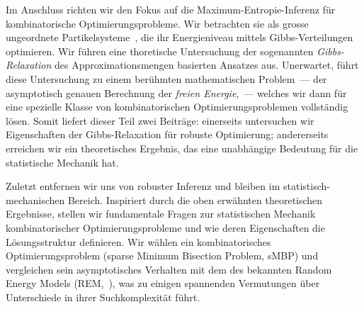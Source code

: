 Im Anschluss richten wir den Fokus auf die Maximum-Entropie-Inferenz für
kombinatorische Optimierungsprobleme. Wir betrachten sie als grosse ungeordnete
Partikelsysteme~\citep{book/MezardM09}, die ihr Energieniveau mittels
Gibbs-Verteilungen optimieren. Wir führen eine thoretische Untersuchung der
sogenannten \textit{Gibbs-Relaxation} des Approximationsmengen basierten
Ansatzes aus. Unerwartet, führt diese Untersuchung zu einem berühmten
mathematischen Problem~--- der asymptotisch genauen Berechnung der
\textit{freien Energie},~--- welches wir dann für eine spezielle Klasse von
kombinatorischen Optimierungsproblemen vollständig lösen. Somit liefert dieser
Teil  zwei Beiträge: einerseits untersuchen wir Eigenschaften der
Gibbs-Relaxation für robuste Optimierung; andererseits erreichen wir ein
theoretisches Ergebnis, das eine unabhängige Bedeutung für die statistische
Mechanik hat.

Zuletzt entfernen wir uns von robuster Inferenz und bleiben im
statistisch-mechanischen Bereich. Inspiriert durch die oben erwähnten
theoretischen Ergebnisse, stellen wir fundamentale Fragen zur statistischen
Mechanik kombinatorischer Optimierungsprobleme und wie deren Eigenschaften die
Lösungsstruktur definieren. Wir wählen ein kombinatorisches Optimierungsproblem
(sparse Minimum Bisection Problem, sMBP) und vergleichen sein asymptotisches
Verhalten mit dem des bekannten Random Energy Models (REM,~\citealp{derrida81}),
was zu einigen spannenden Vermutungen über Unterschiede in ihrer Suchkomplexität
führt.



